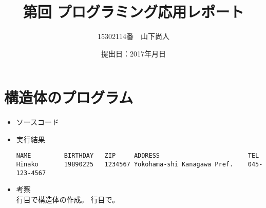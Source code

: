 \documentclass[a4paper]{jsarticle}
\title{第回 プログラミング応用レポート}
\author{15302114番　山下尚人}
\date{提出日：2017年月日}
\begin{document}
\maketitle%

\section{構造体のプログラム}
	\begin{itemize}
	\item ソースコード
		 
		\mbox{}\newline
	\item 実行結果
		\begin{lstlisting}
NAME         BIRTHDAY   ZIP     ADDRESS                        TEL
Hinako       19890225   1234567 Yokohama-shi Kanagawa Pref.    045-123-4567
		\end{lstlisting}
		\mbox{}\newline
	\item 考察\mbox{}\\
		行目で構造体の作成。
		行目で。
	\end{itemize}
	\newpage	%
\end{document}

